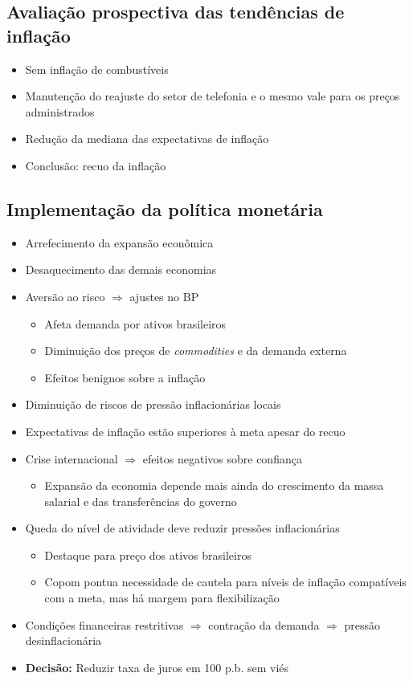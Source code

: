 \documentclass[11pt]{article}
\begin{document}
\subsection*{Avaliação prospectiva das tendências de inflação}
\label{sec:orgb71b609}
\begin{itemize}
\item Sem inflação de combustíveis
\item Manutenção do reajuste do setor de telefonia e o mesmo vale para os preços administrados
\item Redução da mediana das expectativas de inflação
\item Conclusão: recuo da inflação
\end{itemize}
\subsection*{Implementação da política monetária}
\label{sec:orgd5e7848}
\begin{itemize}
\item Arrefecimento da expansão econômica
\item Desaquecimento das demais economias
\item Aversão ao risco \(\Rightarrow\) ajustes no BP
\begin{itemize}
\item Afeta demanda por ativos brasileiros
\item Diminuição dos preços de \emph{commodities} e da demanda externa
\item Efeitos benignos sobre a inflação
\end{itemize}
\item Diminuição de riscos de pressão inflacionárias locais
\item Expectativas de inflação estão superiores à meta apesar do recuo
\item Crise internacional \(\Rightarrow\) efeitos negativos sobre confiança
\begin{itemize}
\item Expansão da economia depende mais ainda do crescimento da massa salarial e das transferências do governo
\end{itemize}
\item Queda do nível de atividade deve reduzir pressões inflacionárias
\begin{itemize}
\item Destaque para preço dos ativos brasileiros
\item Copom pontua necessidade de cautela para níveis de inflação compatíveis com a meta, mas há margem para flexibilização
\end{itemize}
\item Condições financeiras restritivas \(\Rightarrow\) contração da demanda \(\Rightarrow\) pressão desinflacionária
\item \textbf{Decisão:} Reduzir taxa de juros em 100 p.b. sem viés
\end{itemize}
\end{document}
